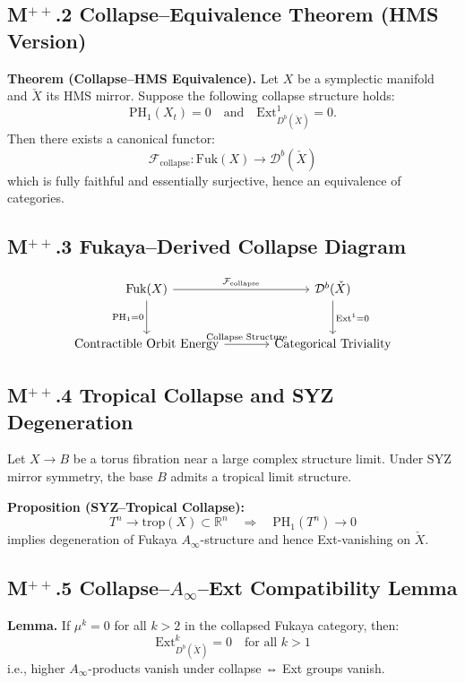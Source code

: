 \documentclass[11pt]{article}
\begin{document}
\begin{axiom}
\begin{axiom}
{{\subsection*{M$^{++}$.2 Collapse–Equivalence Theorem (HMS Version)}

\textbf{Theorem (Collapse–HMS Equivalence).}  
Let \( X \) be a symplectic manifold and \( \check{X} \) its HMS mirror.  
Suppose the following collapse structure holds:
\[
\mathrm{PH}_1(X_t) = 0 \quad \text{and} \quad \mathrm{Ext}^1_{D^b(\check{X})} = 0.
\]
Then there exists a canonical functor:
\[
\mathcal{F}_{\mathrm{collapse}} : \mathrm{Fuk}(X) \to \mathcal{D}^b(\check{X})
\]
which is fully faithful and essentially surjective, hence an equivalence of categories.

\subsection*{M$^{++}$.3 Fukaya–Derived Collapse Diagram}

\[
\begin{tikzcd}[row sep=large, column sep=large]
\mathrm{Fuk}(X) \arrow[r, "\mathcal{F}_{\mathrm{collapse}}"] \arrow[d, swap, "\text{PH}_1 = 0"]
& \mathcal{D}^b(\check{X}) \arrow[d, "\text{Ext}^1 = 0"] \\
\text{Contractible Orbit Energy} \arrow[r, "\text{Collapse Structure}"]
& \text{Categorical Triviality}
\end{tikzcd}
\]

\subsection*{M$^{++}$.4 Tropical Collapse and SYZ Degeneration}

Let \( X \to B \) be a torus fibration near a large complex structure limit.  
Under SYZ mirror symmetry, the base \( B \) admits a tropical limit structure.

\textbf{Proposition (SYZ–Tropical Collapse):}
\[
T^n \to \text{trop}(X) \subset \mathbb{R}^n \quad \Rightarrow \quad \mathrm{PH}_1(T^n) \to 0
\]
implies degeneration of Fukaya \( A_\infty \)-structure and hence Ext-vanishing on \( \check{X} \).

\subsection*{M$^{++}$.5 Collapse–\( A_\infty \)–Ext Compatibility Lemma}

\textbf{Lemma.}  
If \( \mu^k = 0 \) for all \( k > 2 \) in the collapsed Fukaya category, then:
\[
\mathrm{Ext}^k_{D^b(\check{X})} = 0 \quad \text{for all } k > 1
\]
i.e., higher \( A_\infty \)-products vanish under collapse ⇔ Ext groups vanish.

}}
\end{axiom}
\end{axiom}
\end{document}
